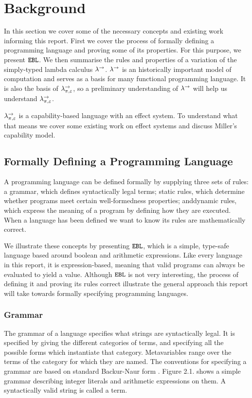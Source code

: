 \chapter{Background}\label{C:background}

In this section we cover some of the necessary concepts and existing work informing this report. First we cover the process of formally defining a programming language and proving some of its properties. For this purpose, we present $\mathtt{EBL}$. We then summarise the rules and properties of a variation of the simply-typed lambda calculus $\lambda^{\rightarrow}$. $\lambda^{\rightarrow}$ is an historically important model of computation and serves as a basis for many functional programming language. It is also the basis of $\lambda^{\rightarrow}_{\pi, \varepsilon}$, so a preliminary understanding of $\lambda^{\rightarrow}$ will help us understand $\lambda^{\rightarrow}_{\pi, \varepsilon}$.

$\lambda^{\rightarrow}_{\pi, \varepsilon}$ is a capability-based language with an effect system. To understand what that means we cover some existing work on effect systems and discuss Miller's capability model.


\section{Formally Defining a Programming Language}

A programming language can be defined formally by supplying three sets of rules: a grammar, which defines syntactically legal terms; static rules, which determine whether programs meet certain well-formedness properties; anddynamic rules, which express the meaning of a program by defining how they are executed. When a language has been defined we want to know its rules are mathematically correct.

We illustrate these concepts by presenting $\mathtt{EBL}$, which is a simple, type-safe language based around boolean and arithmetic expressions. Like every language in this report, it is expression-based, meaning that valid programs can always be evaluated to yield a value. Although $\mathtt{EBL}$ is not very interesting, the process of defining it and proving its rules correct illustrate the general approach this report will take towards formally specifying programming languages.

\subsection{Grammar}

The grammar of a language specifies what strings are syntactically legal. It is specified by giving the different categories of terms, and specifying all the possible forms which instantiate that category. Metavariables range over the terms of the category for which they are named. The conventions for specifying a grammar are based on standard Backur-Naur form \cite{bnf}. Figure 2.1. shows a simple grammar describing integer literals and arithmetic expressions on them. A syntactically valid string is called a term.

